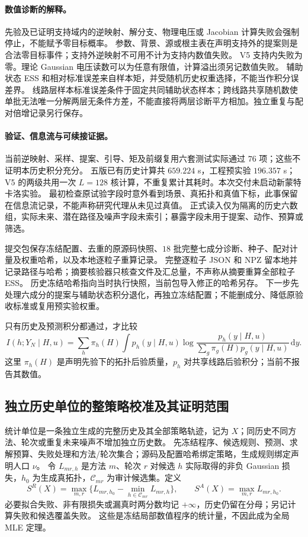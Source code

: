 \documentclass[UTF8,fontset=fandol,11pt,a4paper]{ctexart}
\begin{document}
\paragraph{数值诊断的解释。}
先验及已证明支持域内的逆映射、解分支、物理电压或 Jacobian 计算失败会强制停止，不能赋予零目标概率。
参数、背景、源或根主表在声明支持外的提案则是合法零目标事件；支持外逆映射不可用不计为支持内数值失败。
V5 支持内失败为零。理论 Gaussian 电压读数可以为任意有限值，计算溢出须另记数值失败。
辅助状态 ESS 和相对标准误差来自样本矩，并受随机历史权重选择，不能当作积分误差界。
线路层样本标准误差条件于固定共同辅助状态样本；跨线路共享随机数使单批无法唯一分解两层无条件方差，不能直接将两层诊断平方相加。独立重复与配对倍增记录另行保存。

\paragraph{验证、信息流与可续接证据。}
当前逆映射、采样、提案、引导、矩及前缀复用六套测试实际通过 $76$ 项；这些不证明本历史积分充分。
五版已有历史计算共 $659.224$ s，工程预实验 $196.357$ s；V5 的两级共用一次 $L=128$ 核计算，不重复累计其耗时。本次交付未启动新蒙特卡洛实验。
最初检查原试验字段时意外看到场景、真拓扑和真值下标，此事保留在信息流记录，不能声称研究代理从未见过真值。
正式读入仅为隔离的历史六数组，实际未来、潜在路径及噪声字段未索引；暴露字段未用于提案、动作、预算或筛选。

提交包保存冻结配置、去重的原源码快照、$18$ 批完整七成分诊断、种子、配对计量及权重哈希，以及本地逐粒子重算记录。
完整逐粒子 JSON 和 NPZ 留本地并记录路径与哈希；摘要核验器只核查文件及汇总量，不声称从摘要重算全部粒子 ESS。
历史冻结哈希指向当时执行快照，当前包导入修正的哈希另存。
下一步先处理六成分的提案与辅助状态积分退化，再独立冻结配置；不能删成分、降低原验收标准或复用预实验权重。

只有历史及预测积分都通过，才比较
\[
 I(h;Y_N\mid H,u)=\sum_h\pi_h(H)\int p_h(y\mid H,u)
 \log\frac{p_h(y\mid H,u)}{\sum_g\pi_g(H)p_g(y\mid H,u)}\,\mathrm dy.
\]
这里 $\pi_h(H)$ 是声明先验下的拓扑后验质量，$p_h$ 对共享线路后验积分；当前不报告其数值。


\subsection{独立历史单位的整策略校准及其证明范围}
统计单位是一条独立生成的完整历史及其全部策略轨迹，记为 $X$；同历史不同方法、轮次或重复未来噪声不增加独立历史数。
先冻结程序、候选规则、预测、求解预算、失败处理和方法/轮次集合；源码及配置哈希绑定策略，生成规则绑定声明人口 $\nu$。
令 $L_{mr,h}$ 是方法 $m$、轮次 $r$ 对候选 $h$ 实际取得的非负 Gaussian 损失，$h_0$ 为生成真拓扑，$\mathcal C_{mr}$ 为审计候选集。定义
\begin{equation}
 S^R(X)=\max_{m,r}\{L_{mr,h_0}-\min_{h\in\mathcal C_{mr}}L_{mr,h}\},\qquad
 S^A(X)=\max_{m,r}L_{mr,h_0}.
 \label{eq:adapt-policy-scores}
\end{equation}
必要拟合失败、非有限损失或漏真时两分数均记 $+\infty$，历史仍留在分母；另记计算失败和候选覆盖失败。
这些是冻结局部数值程序的统计量，不因此成为全局 MLE 定理。
\end{document}
